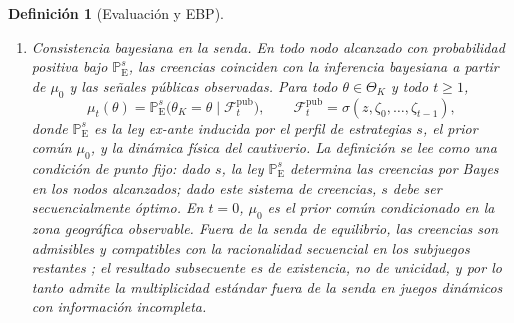 \documentclass[pdflatex,sn-mathphys-ay]{sn-jnl}
\providecommand{\textcite}{\citet}
\theoremstyle{thmstyleone}
\theoremstyle{thmstyletwo}
\theoremstyle{thmstylethree}
\newtheorem{definition}{Definición}
\newcommand{\ProbE}{\mathbb{P}_{\mathrm{E}}}
\newcommand{\ThetaK}{\Theta_K}
\newcommand{\1}{\mathbf{1}}
\begin{document}
\begin{definition}[Evaluación y EBP]
\begin{enumerate}
  \item[\textup{(b)}] Consistencia bayesiana en la senda. En todo nodo alcanzado con probabilidad positiva bajo $\ProbE^s$, las creencias coinciden con la inferencia bayesiana a partir de $\mu_0$ y las señales públicas observadas. Para todo $\theta\in\ThetaK$ y todo $t\ge 1$,
  \begin{equation}
  \label{eq:def712-bayes-mu}
  \mu_t(\theta)=\ProbE^s\!\bigl(\theta_K=\theta\mid \mathcal{F}_t^{\mathrm{pub}}\bigr),
  \qquad
  \mathcal{F}_t^{\mathrm{pub}}=\sigma(z,\zeta_0,\ldots,\zeta_{t-1}),
  \end{equation}
  donde $\ProbE^s$ es la ley ex-ante inducida por el perfil de estrategias $s$, el prior común $\mu_0$, y la dinámica física del cautiverio. La definición se lee como una condición de punto fijo: dado $s$, la ley $\ProbE^s$ determina las creencias por Bayes en los nodos alcanzados; dado este sistema de creencias, $s$ debe ser secuencialmente óptimo. En $t=0$, $\mu_0$ es el prior común condicionado en la zona geográfica observable. Fuera de la senda de equilibrio, las creencias son admisibles y compatibles con la racionalidad secuencial en los subjuegos restantes \textcite{FudenbergTirole1991,KrepsWilson1982}; el resultado subsecuente es de existencia, no de unicidad, y por lo tanto admite la multiplicidad estándar fuera de la senda en juegos dinámicos con información incompleta.
\end{enumerate}
\end{definition}
\end{document}
